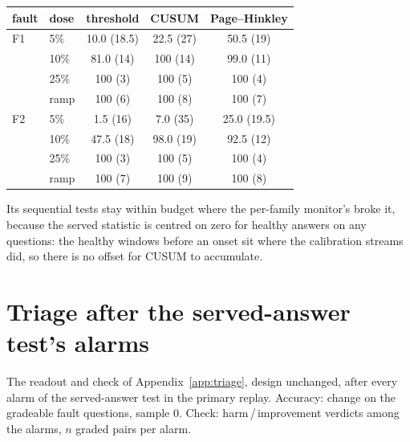 \documentclass{article}
\begin{document}
\begin{center}\small
\setlength{\tabcolsep}{3.4pt}
\begin{tabular}{llccc}
  \toprule
  fault & dose & threshold & CUSUM & Page--Hinkley \\
  \midrule
  F1 & 5\% & 10.0 (18.5) & 22.5 (27) & 50.5 (19) \\
     & 10\% & 81.0 (14) & 100 (14) & 99.0 (11) \\
     & 25\% & 100 (3) & 100 (5) & 100 (4) \\
     & ramp & 100 (6) & 100 (8) & 100 (7) \\
  F2 & 5\% & 1.5 (16) & 7.0 (35) & 25.0 (19.5) \\
     & 10\% & 47.5 (18) & 98.0 (19) & 92.5 (12) \\
     & 25\% & 100 (3) & 100 (5) & 100 (4) \\
     & ramp & 100 (7) & 100 (9) & 100 (8) \\
  \bottomrule
\end{tabular}
\end{center}

\noindent Its sequential tests stay within budget where the per-family monitor's
broke it, because the served statistic is centred on zero for healthy answers on
any questions: the healthy windows before an onset sit where the calibration
streams did, so there is no offset for CUSUM to accumulate.

\section{Triage after the served-answer test's alarms}
\label{app:triage2}

The readout and check of Appendix~\ref{app:triage}, design unchanged, after every
alarm of the served-answer test in the primary replay. Accuracy: change on the
gradeable fault questions, sample 0. Check: harm\,/\,improvement verdicts among the
alarms, $n$ graded pairs per alarm.
\end{document}

